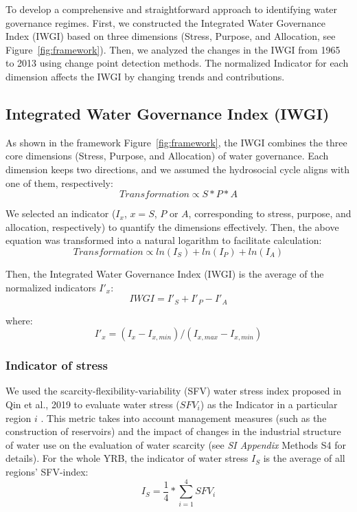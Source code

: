 To develop a comprehensive and straightforward approach to identifying water governance regimes. First, we constructed the Integrated Water Governance Index (IWGI) based on three dimensions (Stress, Purpose, and Allocation, see Figure~\ref{fig:framework}). Then, we analyzed the changes in the IWGI from 1965 to 2013 using change point detection methods. The normalized Indicator for each dimension affects the IWGI by changing trends and contributions.

\subsection{Integrated Water Governance Index (IWGI)}

	As shown in the framework Figure~\ref{fig:framework}, the IWGI combines the three core dimensions (Stress, Purpose, and Allocation) of water governance. Each dimension keeps two directions, and we assumed the hydrosocial cycle aligns with one of them, respectively:
	\begin{equation}
		Transformation \propto S*P*A
	\end{equation}

	We selected an indicator ($I_x$, $x=S$, $P$ or $A$, corresponding to stress, purpose, and allocation, respectively) to quantify the dimensions effectively. Then, the above equation was transformed into a natural logarithm to facilitate calculation:
	\begin{equation}
		Transformation \propto ln(I_S) + ln(I_P) + ln(I_A)
	\end{equation}

	Then, the Integrated Water Governance Index (IWGI) is the average of the normalized indicators $I'_x$:
	\begin{equation}
		IWGI = I'_S + I'_P - I'_A
	\end{equation}

	where:
	\begin{equation}
		I'_x = (I_x - I_{x, min}) / (I_{x, max} - I_{x, min})
	\end{equation}

	\subsubsection*{Indicator of stress}
	We used the scarcity-flexibility-variability (SFV) water stress index proposed in Qin et al., 2019 to evaluate water stress ($SFV_i$) as the Indicator in a particular region $i$ \cite{qinFlexibilityintensityglobal2019}. This metric takes into account management measures (such as the construction of reservoirs) and the impact of changes in the industrial structure of water use on the evaluation of water scarcity (see \textit{SI Appendix} Methods S4 for details). For the whole YRB, the indicator of water stress $I_S$ is the average of all regions' SFV-index:
	\begin{equation}
		I_S = \frac{1}{4} * \sum_{i=1}^4 SFV_{i}
	\end{equation}

